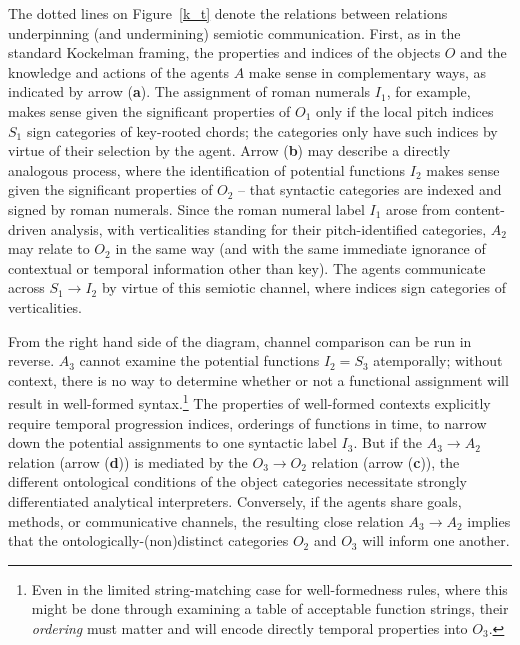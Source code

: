 The dotted lines on Figure~\ref{k_t} denote the relations between relations underpinning (and undermining) semiotic communication.  First, as in the standard Kockelman framing, the properties and indices of the objects $O$ and the knowledge and actions of the agents $A$ make sense in complementary ways, as indicated by arrow (\textbf{a}).  The assignment of roman numerals $I_1$, for example, makes sense given the significant properties of $O_1$ only if the local pitch indices $S_1$ sign categories of key-rooted chords; the categories only have such indices by virtue of their selection by the agent.  Arrow (\textbf{b}) may describe a directly analogous process, where the identification of potential functions $I_2$ makes sense given the significant properties of $O_2$ -- that syntactic categories are indexed and signed by roman numerals.  Since the roman numeral label $I_1$ arose from content-driven analysis, with verticalities standing for their pitch-identified categories, $A_2$ may relate to $O_2$ in the same way (and with the same immediate ignorance of contextual or temporal information other than key).  The agents communicate across $S_1 \rightarrow I_2$ by virtue of this semiotic channel, where indices sign categories of verticalities.%

From the right hand side of the diagram, channel comparison can be run in reverse.  $A_3$ cannot examine the potential functions $I_2 = S_3$ atemporally; without context, there is no way to determine whether or not a functional assignment will result in well-formed syntax.\footnote{Even in the limited string-matching case for well-formedness rules, where this might be done through examining a table of acceptable function strings, their \emph{ordering} must matter and will encode directly temporal properties into $O_3$.}  The properties of well-formed contexts explicitly require temporal progression indices, orderings of functions in time, to narrow down the potential assignments to one syntactic label $I_3$.  But if the $A_3 \rightarrow A_2$ relation (arrow (\textbf{d})) is mediated by the $O_3 \rightarrow  O_2$ relation (arrow (\textbf{c})), the different ontological conditions of the object categories necessitate strongly differentiated analytical interpreters.  Conversely, if the agents share goals, methods, or communicative channels, the resulting close relation $A_3 
\rightarrow A_2$ implies that the ontologically-(non)distinct categories $O_2$ and $O_3$ will inform one another.

